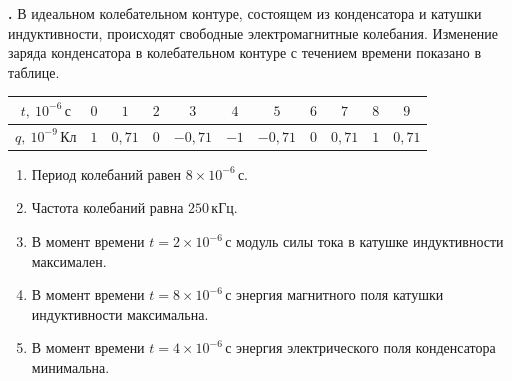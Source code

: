 \documentclass[12pt,a4paper]{article}
\newif\ifShowSolutions
\newcounter{banktask}
\newcommand{\BankTask}[3]{%
  \refstepcounter{banktask}%
  \Needspace{35mm}\par\medskip\noindent\begin{minipage}{\linewidth}%
  \noindent\textbf{\thebanktask.}\quad #2\par
  \ifShowSolutions
    #3\par
    \ifdefined\TutorEdition
      \ifcsname TutorSource#1\endcsname
        \smallskip{\small\csname TutorSource#1\endcsname\par}%
      \fi
    \fi
  \fi
  \end{minipage}\par\medskip
}
\begin{document}
\BankTask{Fc855A}{
В идеальном колебательном контуре, состоящем из конденсатора и катушки индуктивности, происходят свободные электромагнитные колебания. Изменение заряда конденсатора в колебательном контуре с течением времени показано в таблице.

\begin{center}
\begin{tabular}{|c|c|c|c|c|c|c|c|c|c|c|}
\hline
$t,\ 10^{-6}\,\text{с}$ & $0$ & $1$ & $2$ & $3$ & $4$ & $5$ & $6$ & $7$ & $8$ & $9$ \\
\hline
$q,\ 10^{-9}\,\text{Кл}$ & $1$ & $0{,}71$ & $0$ & $-0{,}71$ & $-1$ & $-0{,}71$ & $0$ & $0{,}71$ & $1$ & $0{,}71$ \\
\hline
\end{tabular}
\end{center}

\begin{enumerate}
\item Период колебаний равен $8\times10^{-6}\,\text{с}$.
\item Частота колебаний равна $250\,\text{кГц}$.
\item В момент времени $t=2\times10^{-6}\,\text{с}$ модуль силы тока в катушке индуктивности максимален.
\item В момент времени $t=8\times10^{-6}\,\text{с}$ энергия магнитного поля катушки индуктивности максимальна.
\item В момент времени $t=4\times10^{-6}\,\text{с}$ энергия электрического поля конденсатора минимальна.
\end{enumerate}
}{
\smallskip\noindent\textbf{Решение от GPT}\par
Заряд возвращается к исходному максимуму через $T=8\times10^{-6}\,\text{с}$, поэтому утверждение 1 верно. Частота $\nu=1/T=125\,\text{кГц}$, поэтому утверждение 2 неверно. При $t=2\times10^{-6}\,\text{с}$ заряд равен нулю, а модуль тока максимален, поэтому утверждение 3 верно. При $t=8\times10^{-6}\,\text{с}$ заряд максимален, ток и энергия магнитного поля равны нулю, поэтому утверждение 4 неверно. При $t=4\times10^{-6}\,\text{с}$ модуль заряда максимален и энергия $W_{\text{эл}}=q^2/(2C)$ максимальна, поэтому утверждение 5 неверно. Ответ: 1, 3.
}
\end{document}
